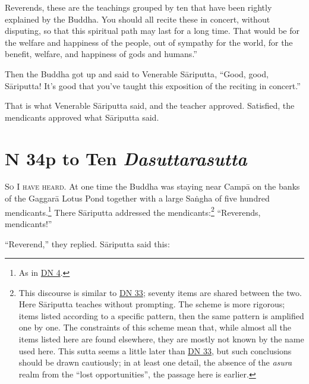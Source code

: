 \documentclass[12pt,openany]{book}%
\newcommand*{\suttatitleacronym}[1]{\smaller[2]{#1}\vspace*{.3em}}
\newcommand*{\suttatitletranslation}[1]{\linebreak{#1}}
\newcommand*{\suttatitleroot}[1]{\linebreak\smaller[2]\itshape{#1}}
\newcommand*{\tocacronym}[1]{\hspace*{-3.3em}{#1}\quad}
\newcommand*{\toctranslation}[1]{#1}
\newcommand*{\tocroot}[1]{(\textit{#1})}
\newcommand*{\scevam}[1]{\textsc{#1}}
\renewcommand*{\tocacronym}[1]{\hspace*{0em}{#1}\quad}%
\begin{document}
Reverends, these are the teachings grouped by ten that have been rightly explained by the Buddha. You should all recite these in concert, without disputing, so that this spiritual path may last for a long time. That would be for the welfare and happiness of the people, out of sympathy for the world, for the benefit, welfare, and happiness of gods and humans.” 

Then the Buddha got up and said to Venerable \textsanskrit{Sāriputta}, “Good, good, \textsanskrit{Sāriputta}! It’s good that you’ve taught this exposition of the reciting in concert.” 

That is what Venerable \textsanskrit{Sāriputta} said, and the teacher approved. Satisfied, the mendicants approved what \textsanskrit{Sāriputta} said. 

%
\chapter*{{\suttatitleacronym DN 34}{\suttatitletranslation Up to Ten }{\suttatitleroot Dasuttarasutta}}
\addcontentsline{toc}{chapter}{\tocacronym{DN 34} \toctranslation{Up to Ten } \tocroot{Dasuttarasutta}}

\scevam{So I have heard. }At one time the Buddha was staying near \textsanskrit{Campā} on the banks of the \textsanskrit{Gaggarā} Lotus Pond together with a large \textsanskrit{Saṅgha} of five hundred mendicants.\footnote{As in \href{https://suttacentral.net/dn4/en/sujato}{DN 4}. } There \textsanskrit{Sāriputta} addressed the mendicants:\footnote{This discourse is similar to \href{https://suttacentral.net/dn33/en/sujato}{DN 33}; seventy items are shared between the two. Here \textsanskrit{Sāriputta} teaches without prompting. The scheme is more rigorous; items listed according to a specific pattern, then the same pattern is amplified one by one. The constraints of this scheme mean that, while almost all the items listed here are found elsewhere, they are mostly not known by the name used here. This sutta seems a little later than \href{https://suttacentral.net/dn33/en/sujato}{DN 33}, but such conclusions should be drawn cautiously; in at least one detail, the absence of the \textit{asura} realm from the “lost opportunities”, the passage here is earlier. } “Reverends, mendicants!” 

“Reverend,” they replied. \textsanskrit{Sāriputta} said this: 
\end{document}
